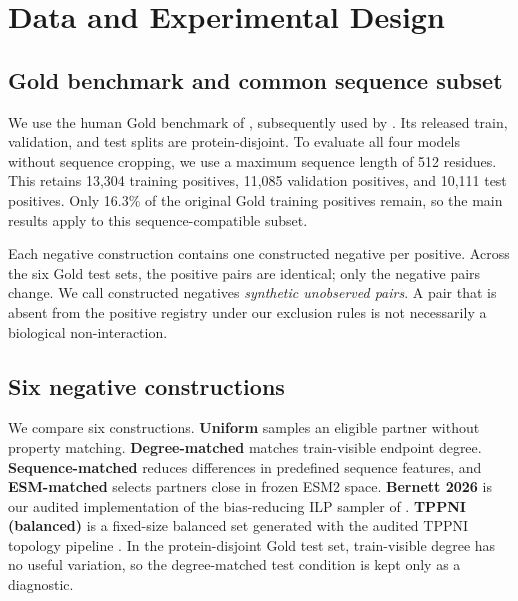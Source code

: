 \documentclass{article}
\begin{document}
\section{Data and Experimental Design}

\subsection{Gold benchmark and common sequence subset}

We use the human Gold benchmark of \citet{bernett2024}, subsequently used by
\citet{reim2025}. Its released train, validation, and test splits are
protein-disjoint. To evaluate all four models without sequence cropping, we use
a maximum sequence length of 512 residues. This retains 13,304 training
positives, 11,085 validation positives, and 10,111 test positives. Only 16.3\%
of the original Gold training positives remain, so the main results apply to
this sequence-compatible subset.

Each negative construction contains one constructed negative per positive.
Across the six Gold test sets, the positive pairs are identical; only the
negative pairs change. We call constructed negatives \emph{synthetic unobserved
pairs}. A pair that is absent from the positive registry under our exclusion
rules is not necessarily a biological non-interaction.

\subsection{Six negative constructions}

We compare six constructions. \textbf{Uniform} samples an eligible partner
without property matching. \textbf{Degree-matched} matches train-visible
endpoint degree. \textbf{Sequence-matched} reduces differences in predefined
sequence features, and \textbf{ESM-matched} selects partners close in frozen
ESM2 space. \textbf{Bernett 2026} is our audited implementation of the
bias-reducing ILP sampler of \citet{bernett2026}. \textbf{TPPNI (balanced)} is
a fixed-size balanced set generated with the audited TPPNI topology pipeline
\citep{chatterjee2025}. In the protein-disjoint Gold test set, train-visible
degree has no useful variation, so the degree-matched test condition is kept
only as a diagnostic.
\end{document}
